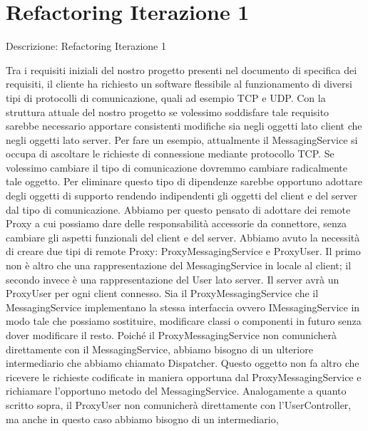 \section{Refactoring Iterazione 1}
\begin{frame}[allowframebreaks] {Descrizione: Refactoring Iterazione 1}
 \begin{scriptsize}
   Tra i requisiti iniziali del nostro progetto presenti nel documento di specifica dei requisiti, il cliente ha richiesto un software flessibile al funzionamento di 
   diversi tipi di protocolli di comunicazione, quali ad esempio TCP e UDP. Con la struttura attuale del nostro progetto se volessimo soddisfare tale requisito 
   sarebbe necessario apportare consistenti modifiche sia negli oggetti lato client che negli oggetti lato server. Per fare un esempio, attualmente il 
   MessagingService si occupa di ascoltare le richieste di connessione mediante protocollo TCP. Se volessimo cambiare il tipo di comunicazione dovremmo cambiare 
   radicalmente tale oggetto. Per eliminare questo tipo di dipendenze sarebbe opportuno adottare degli oggetti di supporto rendendo indipendenti gli oggetti del 
   client e del server dal tipo di comunicazione. Abbiamo per questo pensato di adottare dei remote Proxy a cui possiamo dare delle responsabilità accessorie da 
   connettore, senza cambiare gli aspetti funzionali del client e del server.
   \newline
   Abbiamo avuto la necessità di creare due tipi di remote Proxy:
   \newline
   ProxyMessagingService e ProxyUser. Il primo non è altro che una rappresentazione del MessagingService in locale al client; il secondo invece è una 	
   rappresentazione del User lato server. Il server avrà un ProxyUser per ogni client connesso. Sia il ProxyMessagingService che il MessagingService implementano la  
   stessa interfaccia ovvero IMessagingService in modo tale che possiamo sostituire, modificare classi o componenti in futuro senza dover modificare il resto.
   Poiché il ProxyMessagingService non comunicherà direttamente con il MessagingService, abbiamo bisogno di un ulteriore intermediario che abbiamo chiamato 
   Dispatcher. Questo oggetto non fa altro che ricevere le richieste codificate in maniera opportuna dal ProxyMessagingService e richiamare l'opportuno metodo del 
   MessagingService.
   \newline
   Analogamente a quanto scritto sopra, il ProxyUser non comunicherà direttamente con l'UserController, ma anche in questo caso abbiamo bisogno di un intermediario, 

\end{scriptsize}
\end{frame}
